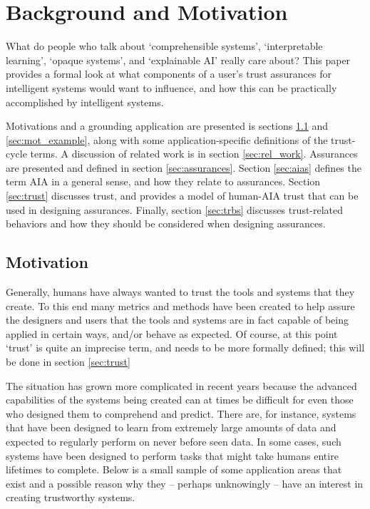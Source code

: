 \section{Background and Motivation} \label{sec:background}

What do people who talk about `comprehensible systems', `interpretable learning', `opaque systems', and `explainable AI' really care about? This paper provides a formal  look at what components of a user's trust assurances for intelligent systems would want to influence, and how this can be practically accomplished by intelligent systems.

Motivations and a grounding application are presented is sections \ref{sec:motivation} and \ref{sec:mot_example}, along with some application-specific definitions of the trust-cycle terms. A discussion of related work is in section \ref{sec:rel_work}. Assurances are presented and defined in section \ref{sec:assurances}.  Section \ref{sec:aias} defines the term AIA in a general sense, and how they relate to assurances. Section \ref{sec:trust} discusses trust, and provides a model of human-AIA trust that can be used in designing assurances. Finally, section \ref{sec:trbs} discusses trust-related behaviors and how they should be considered when designing assurances.

\subsection{Motivation} \label{sec:motivation}
    Generally, humans have always wanted to trust the tools and systems that they create.  To this end many metrics and methods have been created to help assure the designers and users that the tools and systems are in fact capable of being applied in certain ways, and/or behave as expected. Of course, at this point `trust' is quite an imprecise term, and needs to be more formally defined; this will be done in section \ref{sec:trust}

    The situation has grown more complicated in recent years because the advanced capabilities of the systems being created can at times be difficult for even those who designed them to comprehend and predict. There are, for instance, systems that have been designed to learn from extremely large amounts of data and expected to regularly perform on never before seen data. In some cases, such systems have been designed to perform tasks that might take humans entire lifetimes to complete. Below is a small sample of some application areas that exist and a possible reason why they -- perhaps unknowingly -- have an interest in creating trustworthy systems.
    
